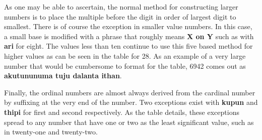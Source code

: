   \par
  As one may be able to ascertain, the normal method for constructing larger numbers is to place the multiple before the digit in order of largest digit to smallest. There is of course the exception in smaller value numbers. In this case, a small base is modified with a phrase that roughly means \textbf{X on Y} such as with \textbf{ari\fivebase} for eight. The values less than ten continue to use this five based method for higher values as can be seen in the table for 28. As an example of a very large number that would be cumbersome to format for the table, 6942 comes out as \textbf{aku\fivebase\space\thousand\space tu\fivebase\space nunuma tuju dalanta ithan}.
  \par
  Finally, the ordinal numbers are almost always derived from the cardinal number by suffixing \suffixtext{\ordnum} at the very end of the number. Two exceptions exist with \textbf{kupun} and \textbf{thipi} for first and second respectively. As the table details, these exceptions spread to any number that have one or two as the least significant value, such as in twenty-one and twenty-two.
  \newline\vertspace
